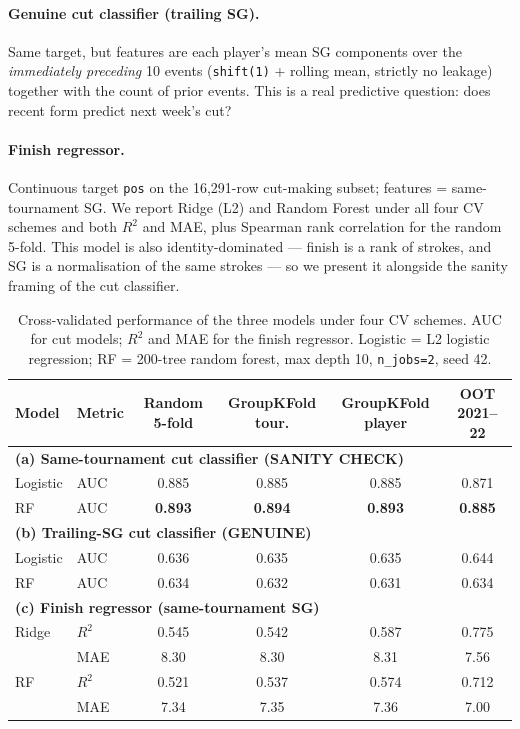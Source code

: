 \documentclass[11pt]{article}
\begin{document}
\paragraph{Genuine cut classifier (trailing SG).}  Same target, but features are each player's mean SG components over the \emph{immediately preceding} 10 events (\texttt{shift(1)} + rolling mean, strictly no leakage) together with the count of prior events.  This is a real predictive question: does recent form predict next week's cut?

\paragraph{Finish regressor.}  Continuous target \texttt{pos} on the 16{,}291-row cut-making subset; features = same-tournament SG.  We report Ridge (L2) and Random Forest under all four CV schemes and both $R^2$ and MAE, plus Spearman rank correlation for the random 5-fold.  This model is also identity-dominated --- finish is a rank of strokes, and SG is a normalisation of the same strokes --- so we present it alongside the sanity framing of the cut classifier.

\begin{table}[t]
\centering
\small
\caption{Cross-validated performance of the three models under four CV schemes.  AUC for cut models; $R^2$ and MAE for the finish regressor.  Logistic = L2 logistic regression; RF = 200-tree random forest, max depth 10, \texttt{n\_jobs=2}, seed 42.}
\label{tab:cv}
\begin{tabular}{llcccc}
\toprule
Model & Metric & Random 5-fold & GroupKFold tour. & GroupKFold player & OOT 2021--22 \\
\midrule
\multicolumn{6}{l}{\textbf{(a) Same-tournament cut classifier (SANITY CHECK)}} \\
Logistic & AUC & 0.885 & 0.885 & 0.885 & 0.871 \\
RF       & AUC & \textbf{0.893} & \textbf{0.894} & \textbf{0.893} & \textbf{0.885} \\
\midrule
\multicolumn{6}{l}{\textbf{(b) Trailing-SG cut classifier (GENUINE)}} \\
Logistic & AUC & 0.636 & 0.635 & 0.635 & 0.644 \\
RF       & AUC & 0.634 & 0.632 & 0.631 & 0.634 \\
\midrule
\multicolumn{6}{l}{\textbf{(c) Finish regressor (same-tournament SG)}} \\
Ridge    & $R^2$ & 0.545 & 0.542 & 0.587 & 0.775 \\
         & MAE   & 8.30  & 8.30  & 8.31  & 7.56 \\
RF       & $R^2$ & 0.521 & 0.537 & 0.574 & 0.712 \\
         & MAE   & 7.34  & 7.35  & 7.36  & 7.00 \\
\bottomrule
\end{tabular}
\end{table}
\end{document}
